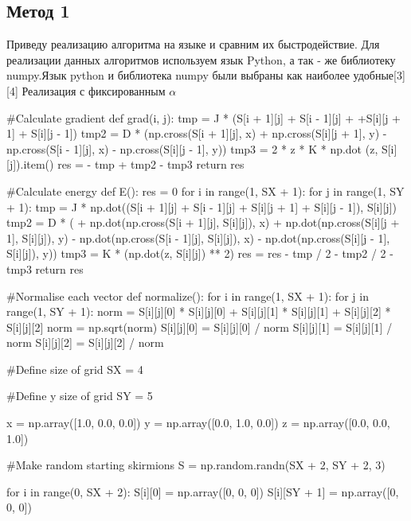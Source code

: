 \documentclass[ 12pt,x11names]{article}
\begin{document}
    \subsection{Метод 1}
    Приведу реализацию алгоритма на языке и сравним их быстродействие.
    Для реализации данных алгоритмов используем язык Python, а так - же библиотеку numpy.Язык python и библиотека numpy  были выбраны как наиболее удобные[3][4]
    Реализация с фиксированным $\alpha$\\
\begin{python}
    #Calculate gradient
    def grad(i, j):
        tmp = J * (S[i + 1][j] + S[i - 1][j] +
        +S[i][j + 1] + S[i][j - 1])
        tmp2 = D * (np.cross(S[i + 1][j], x)
        + np.cross(S[i][j + 1], y)
        - np.cross(S[i - 1][j], x)
        - np.cross(S[i][j - 1], y))
        tmp3 = 2 * z * K * np.dot  (z, S[i][j]).item()
        res = - tmp + tmp2 - tmp3
        return res

    #Calculate energy
    def E():
        res = 0
        for i in range(1, SX + 1):
            for j in range(1, SY + 1):
                tmp = J * np.dot((S[i + 1][j] + S[i - 1][j] +
                S[i][j + 1] + S[i][j - 1]), S[i][j])
                tmp2 = D * (
                + np.dot(np.cross(S[i + 1][j], S[i][j]), x)
                + np.dot(np.cross(S[i][j + 1], S[i][j]), y)
                - np.dot(np.cross(S[i - 1][j], S[i][j]), x)
                - np.dot(np.cross(S[i][j - 1], S[i][j]), y))
                tmp3 = K * (np.dot(z, S[i][j]) ** 2)
                res = res - tmp / 2 - tmp2 / 2 - tmp3
        return res

    #Normalise each vector
    def normalize():
    for i in range(1, SX + 1):
        for j in range(1, SY + 1):
            norm = S[i][j][0] * S[i][j][0] +
                   S[i][j][1] * S[i][j][1] +
                   S[i][j][2] * S[i][j][2]
            norm = np.sqrt(norm)
            S[i][j][0] = S[i][j][0] / norm
            S[i][j][1] = S[i][j][1] / norm
            S[i][j][2] = S[i][j][2] / norm


    #Define size of grid
    SX = 4

    #Define y size of grid
    SY = 5

    x = np.array([1.0, 0.0, 0.0])
    y = np.array([0.0, 1.0, 0.0])
    z = np.array([0.0, 0.0, 1.0])

    #Make random starting skirmions
    S = np.random.randn(SX + 2, SY + 2, 3)

    for i in range(0, SX + 2):
        S[i][0] = np.array([0, 0, 0])
        S[i][SY + 1] = np.array([0, 0, 0])


\end{python}
\end{document}
